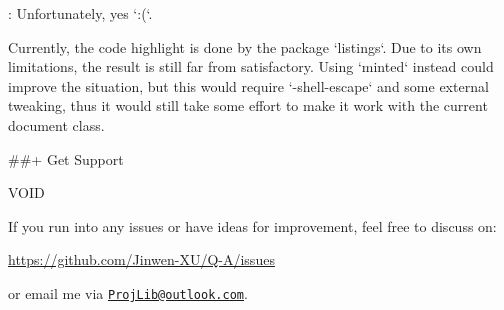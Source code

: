 \documentclass[%
  use style = classical,
  scroll,
]{Q-A}
\begin{document}
:
  Unfortunately, yes `:(`.

  Currently, the code highlight is done by the package `listings`. Due to its own limitations, the result is still far from satisfactory. Using `minted` instead could improve the situation, but this would require `-shell-escape` and some external tweaking, thus it would still take some effort to make it work with the current document class.


##+ {Get Support}

VOID
\bigskip

If you run into any issues or have ideas for improvement, feel free to discuss on:
\begin{center}
    \url{https://github.com/Jinwen-XU/Q-A/issues}
\end{center}
or email me via \href{mailto:ProjLib@outlook.com}{\texttt{ProjLib@outlook.com}}.


\vspace{3\baselineskip}



\end{document}
